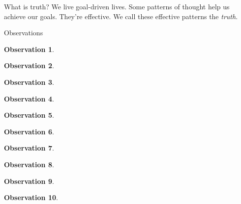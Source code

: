 \documentclass[11pt, oneside]{article}   	%
\newenvironment{answer}[1]
  {\renewcommand\theinnercustomthm{#1}\innercustomthm}
  {\endinnercustomthm}
\newtheorem{obs}{Observation}
\begin{document}
What is truth?
\begin{answer}{1}
    We live goal-driven lives.
    Some patterns of thought help us achieve our goals.
    They're effective.
    We call these effective patterns the {\em truth}.
\end{answer}

%
%
%
%

\pagebreak

{\huge Observations}

\setcounter{obs}{0}

\begin{obs}
    \ \\
    \obsone
\end{obs}

\begin{obs}
    \ \\
    \obstwo
\end{obs}

\begin{obs}
    \ \\
    \obsthree
\end{obs}

\begin{obs}
    \ \\
    \obsfour
\end{obs}

\begin{obs}
    \ \\
    \obsfive
\end{obs}

\begin{obs}
    \ \\
    \obssix
\end{obs}

\begin{obs}
    \ \\
    \obsseven
\end{obs}

\begin{obs}
    \ \\
    \obseight
\end{obs}

\begin{obs}
    \ \\
    \obsnine
\end{obs}

\begin{obs}
    \ \\
    \obsten
\end{obs}
\end{document}
